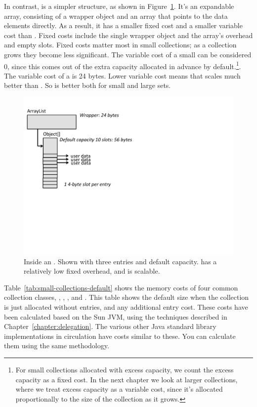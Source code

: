 In contrast,  is a simpler structure, as shown in
Figure~\ref{fig:inside-arraylist}. It's an expandable array,
consisting of a wrapper object and an array that points to the data
elements directly. As a result, it has a smaller fixed cost and a smaller
variable cost than . Fixed costs
include the single wrapper object and the array's \jre overhead and empty
slots. Fixed costs matter most in small collections; as a collection
grows they become less significant. The variable cost of a small
 can be considered 0, since this comes out of the extra
capacity allocated in advance by default.\footnote{For small
collections allocated with excess capacity, we count the excess capacity as a
fixed cost. In the next chapter we look at larger collections, where we treat excess capacity as a
variable cost, since it's allocated
proportionally to the size of the collection as it grows.}.
The variable cost of a  is 24 bytes. Lower variable cost means
that  scales much better than . So  is better both for small and large sets.
 \begin{figure}
  \centering
 \includegraphics[width=.80\textwidth]{part1/Figures/collections/inside-arraylist.pdf}
 \caption{Inside an . Shown with three
 entries and default capacity.  has a relatively low
 fixed overhead, and is scalable.}
  \label{fig:inside-arraylist}
\end{figure}
 

Table~\ref{tab:small-collections-default} shows the memory costs of four common
collection classes, , , , and
.
This table shows the default size when the collection is just allocated without
entries, and any additional entry cost. These costs have
been calculated based on the Sun JVM, using the techniques described in Chapter~\ref{chapter:delegation}. 
The various other Java standard
library implementations in circulation have costs
similar to these. You can calculate them using the same methodology.


